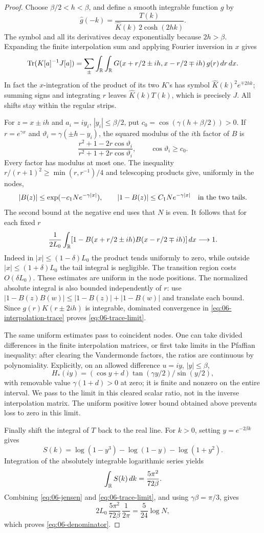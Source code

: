 \begin{proof}
Choose \(\beta/2<h<\beta\), and define a smooth integrable function
\(g\) by
\[
 \widehat g(-k)
 =\frac{T(k)}{\widehat K(k)\,2\cosh(2hk)} .
\]
The symbol and all its derivatives decay exponentially because
\(2h>\beta\).  Expanding the finite interpolation sum and applying
Fourier inversion in \(x\) gives
\begin{equation}
 \operatorname{Tr}(K[a]^{-1}J[a])
 =\sum_{\pm}\int_{\mathbb R}\int_{\mathbb R}
 G(x+r/2\pm ih,x-r/2\mp ih)\,g(r)\,dr\,dx .
 \label{eq:06-interpolation-trace}
\end{equation}
In fact the \(x\)-integration of the product of its two \(K\)'s
has symbol \(\widehat K(k)^2e^{\mp2hk}\);
summing signs and integrating \(r\) leaves
\(\widehat K(k)T(k)\), which is precisely \(J\).
All shifts stay within the regular strips.

For $z=x\pm ih$ and $a_i=iy_i$, $|y_i|\le\beta/2$, put
$c_0=\cos(\gamma(h+\beta/2))>0$. If $r=e^{\gamma x}$ and
$\vartheta_i=\gamma(\pm h-y_i)$, the squared modulus of the
$i$th factor of $B$ is
\[
 \frac{r^2+1-2r\cos\vartheta_i}{r^2+1+2r\cos\vartheta_i},
 \qquad \cos\vartheta_i\ge c_0.
\]
Every factor has modulus at most one. The inequality
$r/(r+1)^2\ge\min(r,r^{-1})/4$ and telescoping products give,
uniformly in the nodes,
\[
 |B(z)|\le\exp(-c_1N e^{-\gamma|x|}),\qquad
 |1-B(z)|\le C_1N e^{-\gamma|x|}
 \quad\hbox{in the two tails}.
\]
The second bound at the negative end uses that \(N\) is even.
It follows that for each fixed \(r\)
\[
 \frac1{2L_0}\int_{\mathbb R}
 [1-B(x+r/2\pm ih)B(x-r/2\mp ih)]\,dx\longrightarrow1.
\]
Indeed in \(|x|\le(1-\delta)L_0\) the product tends uniformly to
zero, while outside \(|x|\le(1+\delta)L_0\) the tail integral is
negligible.  The transition region costs \(O(\delta L_0)\).
These estimates are uniform in the node positions.
The normalized absolute integral is also bounded independently of
\(r\): use
\(|1-B(z)B(w)|\le |1-B(z)|+|1-B(w)|\) and translate each bound.
Since \(g(r)K(r\pm2ih)\) is integrable, dominated convergence in
\eqref{eq:06-interpolation-trace} proves
\eqref{eq:06-trace-limit}.

The same uniform estimates pass to coincident nodes.
One can take divided differences in the finite interpolation
matrices, or first take limits in the Pfaffian inequality:
after clearing the Vandermonde factors, the ratios are continuous
by polynomiality. Explicitly, on an allowed difference $u=iy$,
$|y|\le\beta$,
\[ H_*(iy)=(\cos y+d)\tan(\gamma y/2)/\sin(y/2), \]
with removable value $\gamma(1+d)>0$ at zero; it is finite and
nonzero on the entire interval. We pass to the limit in this cleared
scalar ratio, not in the inverse interpolation matrix. The uniform
positive lower bound obtained
above prevents loss to zero in this limit.

Finally shift the integral of \(T\) back to the real line.
For \(k>0\), setting \(y=e^{-2\beta k}\) gives
\[
 S(k)=\log(1-y^3)-\log(1-y)-\log(1+y^2).
\]
Integration of the absolutely integrable logarithmic series yields
\[
 \int_{\mathbb R}S(k)\,dk=\frac{5\pi^2}{72\beta}.
\]
Combining \eqref{eq:06-jensen} and \eqref{eq:06-trace-limit}, and
using \(\gamma\beta=\pi/3\), gives
\[
 2L_0\,\frac{5\pi^2}{72\beta}\,\frac1{2\pi}
 =\frac5{24}\log N,
\]
which proves \eqref{eq:06-denominator}.
\end{proof}

